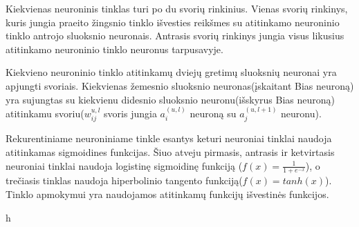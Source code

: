 Kiekvienas neuroninis tinklas turi po du svorių rinkinius. Vienas svorių rinkinys, kuris jungia praeito žingsnio tinklo išvesties reikšmes su atitinkamo neuroninio tinklo antrojo sluoksnio neuronais. Antrasis svorių rinkinys jungia visus likusius atitinkamo neuroninio tinklo neuronus tarpusavyje.

Kiekvieno neuroninio tinklo atitinkamų dviejų gretimų sluoksnių neuronai yra apjungti svoriais. Kiekvienas žemesnio sluoksnio neuronas(įskaitant Bias neuroną) yra sujungtas su kiekvienu didesnio sluoksnio neuronu(išskyrus Bias neuroną) atitinkamu svoriu(\begin{math}w_{ij}^{u,l}\end{math} svoris jungia \begin{math}a_i^{(u,l)}\end{math} neuroną su \begin{math}a_j^{(u,l+1)}\end{math} neuronu).

Rekurentiniame neuroniniame tinkle esantys keturi neuroniai tinklai naudoja atitinkamas sigmoidines funkcijas. Šiuo atveju pirmasis, antrasis ir ketvirtasis neuroniai tinklai naudoja logistinę sigmoidinę funkciją (\begin{math}f(x) = \frac{1}{1+e^{-x}}\end{math}), o trečiasis tinklas naudoja hiperbolinio tangento funkciją(\begin{math}f(x) = tanh(x)\end{math}). Tinklo apmokymui yra naudojamos atitinkamų funkcijų išvestinės funkcijos.

h

